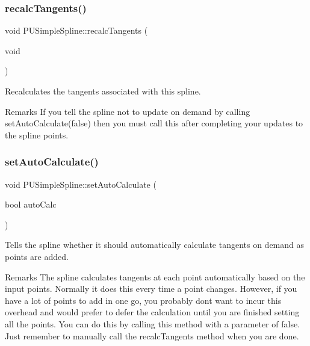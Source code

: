 \subsubsection{\texorpdfstring{recalc\+Tangents()}{recalcTangents()}\hspace{0.1cm}{\footnotesize\ttfamily [2/2]}}
{\footnotesize\ttfamily void P\+U\+Simple\+Spline\+::recalc\+Tangents (\begin{DoxyParamCaption}\item[{void}]{ }\end{DoxyParamCaption})}

Recalculates the tangents associated with this spline. \begin{DoxyRemark}{Remarks}
If you tell the spline not to update on demand by calling set\+Auto\+Calculate(false) then you must call this after completing your updates to the spline points. 
\end{DoxyRemark}
\mbox{\label{classPUSimpleSpline_aaac246974445d71eba4bd4ade9ee6d33}} 
\subsubsection{\texorpdfstring{set\+Auto\+Calculate()}{setAutoCalculate()}\hspace{0.1cm}{\footnotesize\ttfamily [1/2]}}
{\footnotesize\ttfamily void P\+U\+Simple\+Spline\+::set\+Auto\+Calculate (\begin{DoxyParamCaption}\item[{bool}]{auto\+Calc }\end{DoxyParamCaption})}

Tells the spline whether it should automatically calculate tangents on demand as points are added. \begin{DoxyRemark}{Remarks}
The spline calculates tangents at each point automatically based on the input points. Normally it does this every time a point changes. However, if you have a lot of points to add in one go, you probably don\textquotesingle{}t want to incur this overhead and would prefer to defer the calculation until you are finished setting all the points. You can do this by calling this method with a parameter of \textquotesingle{}false\textquotesingle{}. Just remember to manually call the recalc\+Tangents method when you are done. 
\end{DoxyRemark}

